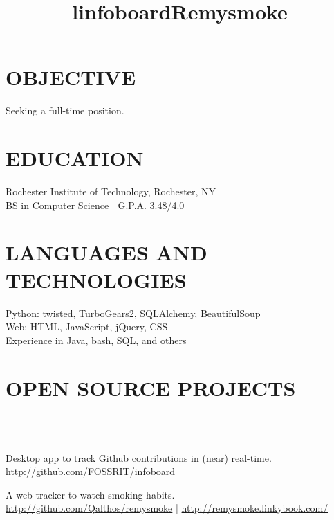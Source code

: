 \documentclass[line]{res}
\begin{document}

\begin{resume}

\section{OBJECTIVE}
    Seeking a full-time position.

\section{EDUCATION}
    Rochester Institute of Technology, Rochester, NY \\
    BS in Computer Science | G.P.A. 3.48/4.0

\section{LANGUAGES AND TECHNOLOGIES}
    Python: twisted, TurboGears2, SQLAlchemy, BeautifulSoup\\
    Web: HTML, JavaScript, jQuery, CSS\\
    Experience in Java, bash, SQL, and others

\section{OPEN SOURCE PROJECTS}
    \begin{format}
        \title{l}\\
        \\
        \body
    \end{format}

    \title{infoboard}
    \employer{}
    \begin{position}
        Desktop app to track Github contributions in (near) real-time.\\
        \url{http://github.com/FOSSRIT/infoboard}
    \end{position}

    \title{Remysmoke}
    \begin{position}
        A web tracker to watch smoking habits.\\
        \url{http://github.com/Qalthos/remysmoke} | \url{http://remysmoke.linkybook.com/}
    \end{position}


\end{resume}
\end{document}
